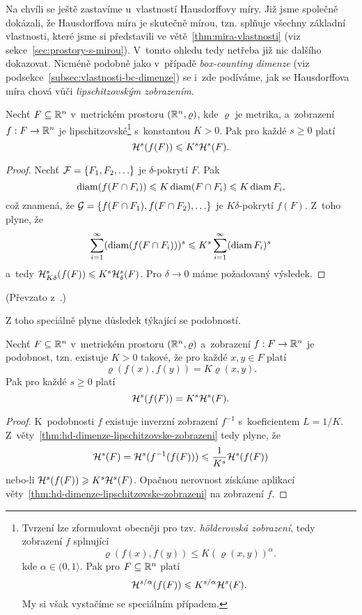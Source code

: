 Na chvíli se ještě zastavíme u~vlastností Hausdorffovy míry. Již jsme společně dokázali, že Hausdorffova míra je skutečně mírou, tzn. splňuje všechny základní vlastnosti, které jsme si představili ve větě~\ref{thm:mira-vlastnosti} (viz sekce~\ref{sec:prostory-s-mirou}). V~tomto ohledu tedy netřeba již nic dalšího dokazovat. Nicméně podobně jako v~případě \emph{box-counting dimenze} (viz podsekce~\ref{subsec:vlastnosti-bc-dimenze}) se i~zde podíváme, jak se Hausdorffova míra chová vůči \emph{lipschitzovským zobrazením}.
\begin{theorem}\label{thm:hd-dimenze-lipschitzovske-zobrazeni}
    Nechť $F\subseteq\R^n$ v~metrickém prostoru $(\R^n,\varrho)$, kde $\varrho$ je metrika, a~zobrazení $\mapping{f}{F}{\R^n}$ je lipschitzovské\footnote{Tvrzení lze zformulovat obecněji pro tzv. \emph{hölderovská zobrazení}, tedy zobrazení $f$ splnující
    \[\varrho(f(x),f(y))\leqslant K(\varrho(x,y))^\alpha.\]
    kde $\alpha\in(0,1\rangle$. Pak pro $F\subseteq\R^n$ platí
    \[\hausdorffmeasure{s/\alpha}(f(F))\leqslant K^{s/\alpha}\hausdorffmeasure{s}(F).\]
    My si však vystačíme se speciálním případem.} s~konstantou $K>0$. Pak pro každé $s\geqslant 0$ platí
    \[\hausdorffmeasure{s}(f(F))\leqslant K^s\hausdorffmeasure{s}(F).\]
\end{theorem}
\begin{proof}
    Nechť $\mathcal{F}=\set{F_1,F_2,\ldots}$ je $\delta$-pokrytí $F$. Pak
    \[\diam(f(F\cap F_i))\leqslant K\diam(F\cap F_i)\leqslant K\diam{F_i},\]
    což znamená, že $\mathcal{G}=\set{f(F\cap F_1),f(F\cap F_2),\ldots}$ je $K\delta$-pokrytí $f(F)$. Z~toho plyne, že
    \[\sum_{i=1}^{\infty}(\diam(f(F\cap F_i)))^s\leqslant K^s\sum_{i=1}^{\infty}(\diam{F_i})^s\]
    a~tedy $\hausdorffdeltameasure{s}{K\delta}(f(F))\leqslant K^s\hausdorffdeltameasure{s}{\delta}(F)$. Pro $\delta\to 0$ máme požadovaný výsledek.
\end{proof}
(Převzato z~\citep[str. 46]{Falconer2014}.)

Z toho speciálně plyne důsledek týkající se podobností.
\begin{corollary}\label{cor:hd-dimenze-podobnost}
    Nechť $F\subseteq\R^n$ v~metrickém prostoru $(\R^n,\varrho)$ a~zobrazení $\mapping{f}{F}{\R^n}$ je podobnost, tzn. existuje $K>0$ takové, že pro každé $x,y\in F$ platí
    \[\varrho(f(x),f(y))=K\varrho(x,y).\]
    Pak pro každé $s\geqslant 0$ platí
    \[\hausdorffmeasure{s}(f(F))=K^s\hausdorffmeasure{s}(F).\]
\end{corollary}
\begin{proof}
    K~podobnosti $f$ existuje inverzní zobrazení $f^{-1}$ s~koeficientem $L=1/K$. Z~věty~\ref{thm:hd-dimenze-lipschitzovske-zobrazeni} tedy plyne, že
    \[\hausdorffmeasure{s}(F)=\hausdorffmeasure{s}(f^{-1}(f(F)))\leqslant\dfrac{1}{K^s}\hausdorffmeasure{s}(f(F))\]
    nebo-li $\hausdorffmeasure{s}(f(F))\geqslant K^s\hausdorffmeasure{s}(F)$. Opačnou nerovnost získáme aplikací věty~\ref{thm:hd-dimenze-lipschitzovske-zobrazeni} na zobrazení $f$.
\end{proof}

